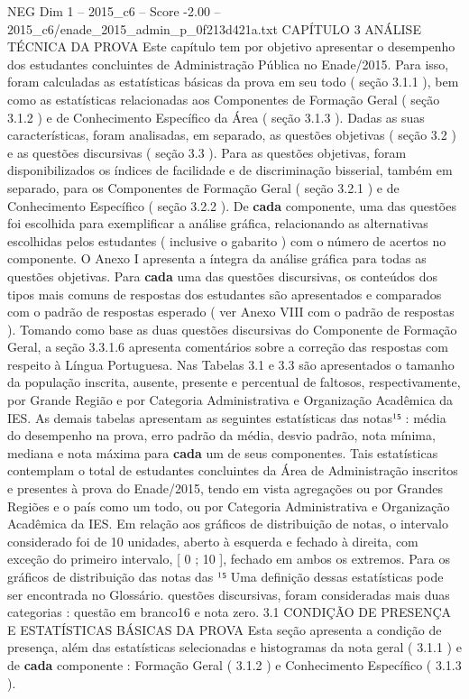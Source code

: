 \begin{textsample}{NEG Dim 1 – 2015\_c6 – Score -2.00 – 2015\_c6/enade\_2015\_admin\_p\_0f213d421a.txt}  \label{ex:f1_neg_285}
CAPÍTULO 3 ANÁLISE TÉCNICA DA PROVA Este capítulo tem por objetivo apresentar o desempenho dos estudantes concluintes de Administração Pública no Enade/2015.
Para isso, foram calculadas as estatísticas básicas da prova em seu todo ( seção 3.1.1 ), bem como as estatísticas relacionadas aos Componentes de Formação Geral ( seção 3.1.2 ) e de Conhecimento Específico da Área ( seção 3.1.3 ).
Dadas as suas características, foram analisadas, em separado, as questões objetivas ( seção 3.2 ) e as questões discursivas ( seção 3.3 ).
Para as questões objetivas, foram disponibilizados os índices de facilidade e de discriminação bisserial, também em separado, para os Componentes de Formação Geral ( seção 3.2.1 ) e de Conhecimento Específico ( seção 3.2.2 ).
De \textbf{cada} componente, uma das questões foi escolhida para exemplificar a análise gráfica, relacionando as alternativas escolhidas pelos estudantes ( inclusive o gabarito ) com o número de acertos no componente.
O Anexo I apresenta a íntegra da análise gráfica para todas as questões objetivas.
Para \textbf{cada} uma das questões discursivas, os conteúdos dos tipos mais comuns de respostas dos estudantes são apresentados e comparados com o padrão de respostas esperado ( ver Anexo VIII com o padrão de respostas ).
Tomando como base as duas questões discursivas do Componente de Formação Geral, a seção 3.3.1.6 apresenta comentários sobre a correção das respostas com respeito à Língua Portuguesa.
Nas Tabelas 3.1 e 3.3 são apresentados o tamanho da população inscrita, ausente, presente e percentual de faltosos, respectivamente, por Grande Região e por Categoria Administrativa e Organização Acadêmica da IES.
As demais tabelas apresentam as seguintes estatísticas das notas¹⁵ : média do desempenho na prova, erro padrão da média, desvio padrão, nota mínima, mediana e nota máxima para \textbf{cada} um de seus componentes.
Tais estatísticas contemplam o total de estudantes concluintes da Área de Administração inscritos e presentes à prova do Enade/2015, tendo em vista agregações ou por Grandes Regiões e o país como um todo, ou por Categoria Administrativa e Organização Acadêmica da IES.
Em relação aos gráficos de distribuição de notas, o intervalo considerado foi de 10 unidades, aberto à esquerda e fechado à direita, com exceção do primeiro intervalo, [ 0 ; 10 ], fechado em ambos os extremos.
Para os gráficos de distribuição das notas das ¹⁵ Uma definição dessas estatísticas pode ser encontrada no Glossário. questões discursivas, foram consideradas mais duas categorias : questão em branco16 e nota zero. 3.1 CONDIÇÃO DE PRESENÇA E ESTATÍSTICAS BÁSICAS DA PROVA Esta seção apresenta a condição de presença, além das estatísticas selecionadas e histogramas da nota geral ( 3.1.1 ) e de \textbf{cada} componente : Formação Geral ( 3.1.2 ) e Conhecimento Específico ( 3.1.3 ).

\end{textsample}
